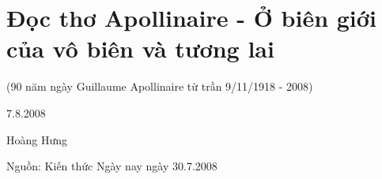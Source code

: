 \documentclass[../main.tex]{subfiles}
\begin{document}
\chapter{Đọc thơ Apollinaire - Ở biên giới của vô biên và tương lai}

\begin{subtitle}

(90 năm ngày Guillaume Apollinaire từ trần 9/11/1918 - 2008)

\end{subtitle}

\begin{metadata}

\begin{flushright}7.8.2008\end{flushright}

Hoàng Hưng

Nguồn: Kiến thức Ngày nay ngày 30.7.2008

\end{metadata}
\end{document}
